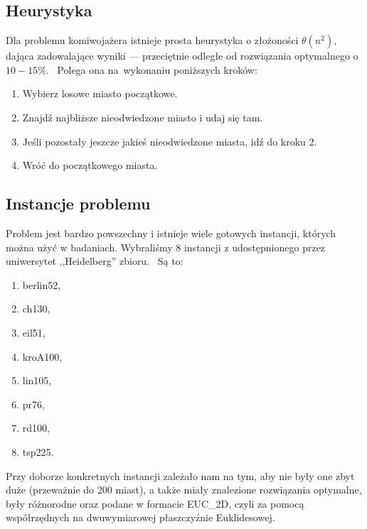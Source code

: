 \subsection{Heurystyka}

Dla problemu komiwojażera istnieje prosta heurystyka o złożoności $\theta(n^2)$, dająca zadowalające wyniki --- przeciętnie odległe od rozwiązania optymalnego o~$10-15\%$.~\cite{Heuristic} Polega ona na~wykonaniu poniższych kroków:

\begin{enumerate}
    \item Wybierz losowe miasto początkowe.
    \item Znajdź najbliższe nieodwiedzone miasto i udaj się tam.
    \item Jeśli pozostały jeszcze jakieś nieodwiedzone miasta, idź do kroku 2.
    \item Wróć do początkowego miasta.
\end{enumerate}

\subsection{Instancje problemu}

Problem jest bardzo powszechny i istnieje wiele gotowych instancji, których można użyć w badaniach. Wybraliśmy 8 instancji z udostępnionego przez uniwersytet ,,Heidelberg'' zbioru.~\cite{instances} Są to:

\begin{enumerate}
    \item berlin52,
    \item ch130,
    \item eil51,
    \item kroA100,
    \item lin105,
    \item pr76,
    \item rd100,
    \item tsp225.
\end{enumerate}

Przy doborze konkretnych instancji zależało nam na tym, aby nie były one zbyt duże (przeważnie do 200 miast), a także miały znalezione rozwiązania optymalne, były różnorodne oraz podane w formacie EUC\_2D, czyli za pomocą współrzędnych na dwuwymiarowej płaszczyźnie Euklidesowej.